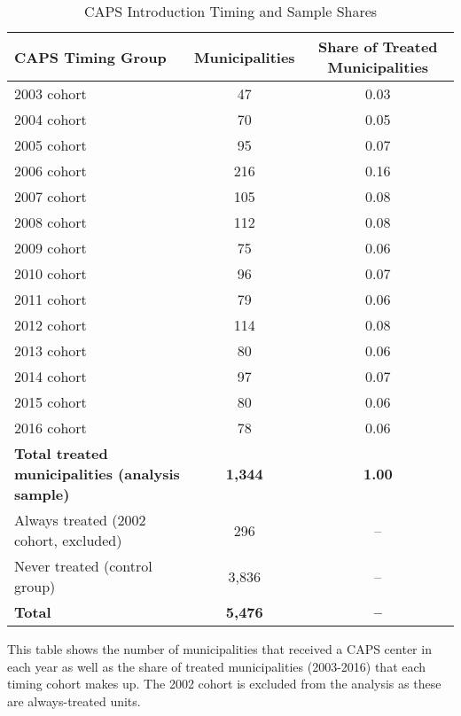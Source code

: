 \begin{table}[htbp]\centering
\footnotesize
\caption{CAPS Introduction Timing and Sample Shares}
\label{tab:municipalitybycohort}
\begin{threeparttable}
\begin{tabular}{lcc}
\toprule
\textbf{CAPS Timing Group} & \textbf{Municipalities} & \textbf{Share of Treated Municipalities} \\
\midrule
2003 cohort &        47 & 0.03 \\
2004 cohort &        70 & 0.05 \\
2005 cohort &        95 & 0.07 \\
2006 cohort &       216 & 0.16 \\
2007 cohort &       105 & 0.08 \\
2008 cohort &       112 & 0.08 \\
2009 cohort &        75 & 0.06 \\
2010 cohort &        96 & 0.07 \\
2011 cohort &        79 & 0.06 \\
2012 cohort &       114 & 0.08 \\
2013 cohort &        80 & 0.06 \\
2014 cohort &        97 & 0.07 \\
2015 cohort &        80 & 0.06 \\
2016 cohort &        78 & 0.06 \\
\midrule
\textbf{Total treated municipalities (analysis sample)} & \textbf{    1,344} & \textbf{1.00} \\
\midrule
Always treated (2002 cohort, excluded) &       296 & -- \\
Never treated (control group) &     3,836 & -- \\
\midrule
\textbf{Total} & \textbf{    5,476} & \textbf{--} \\
\bottomrule
\end{tabular}
\begin{tablenotes}
\footnotesize
\item This table shows the number of municipalities that received a CAPS center in each year as well as the share of treated municipalities (2003-2016) that each timing cohort makes up. The 2002 cohort is excluded from the analysis as these are always-treated units.
\end{tablenotes}
\end{threeparttable}
\end{table}

